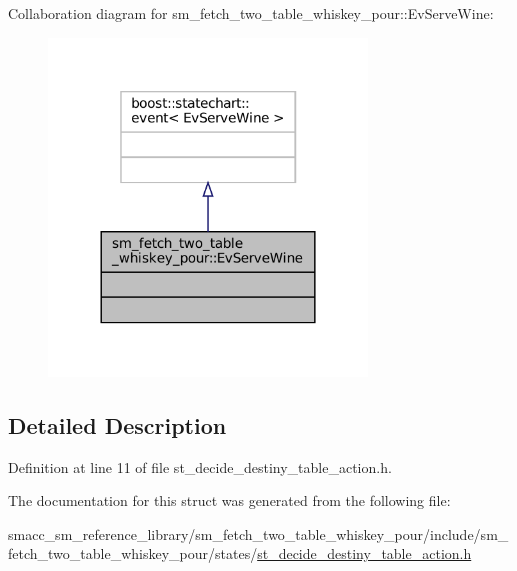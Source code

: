 Collaboration diagram for sm\+\_\+fetch\+\_\+two\+\_\+table\+\_\+whiskey\+\_\+pour\+:\+:Ev\+Serve\+Wine\+:
\nopagebreak
\begin{figure}[H]
\begin{center}
\leavevmode
\includegraphics[width=240pt]{structsm__fetch__two__table__whiskey__pour_1_1EvServeWine__coll__graph}
\end{center}
\end{figure}


\subsection{Detailed Description}


Definition at line 11 of file st\+\_\+decide\+\_\+destiny\+\_\+table\+\_\+action.\+h.



The documentation for this struct was generated from the following file\+:\begin{DoxyCompactItemize}
\item 
smacc\+\_\+sm\+\_\+reference\+\_\+library/sm\+\_\+fetch\+\_\+two\+\_\+table\+\_\+whiskey\+\_\+pour/include/sm\+\_\+fetch\+\_\+two\+\_\+table\+\_\+whiskey\+\_\+pour/states/\hyperlink{st__decide__destiny__table__action_8h}{st\+\_\+decide\+\_\+destiny\+\_\+table\+\_\+action.\+h}\end{DoxyCompactItemize}
